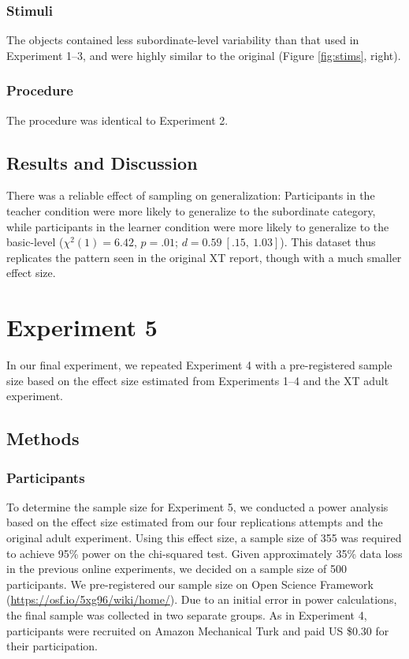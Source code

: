 \documentclass[man]{apa2}
\begin{document}
\subsubsection{Stimuli}

The objects contained less subordinate-level variability than that used in Experiment 1--3, and were highly similar to the original (Figure \ref{fig:stims}, right).

\subsubsection{Procedure}

The procedure was identical to Experiment 2.

\subsection{Results and Discussion}


There was a reliable effect of sampling on generalization: Participants in the teacher condition were more likely to generalize to the subordinate category, while participants in the learner condition were more likely to generalize to the basic-level ($\chi^2(1) = 6.42$, $p = .01$; $d = 0.59\ [.15,\ 1.03]$). This dataset thus replicates the pattern seen in the original XT report, though with a much smaller effect size.

\section{Experiment 5}

In our final experiment, we repeated Experiment 4 with a pre-registered sample size based on the effect size estimated from Experiments 1--4 and the XT adult experiment. 

\subsection{Methods}

\subsubsection{Participants}  

To determine the sample size for Experiment 5, we conducted a power analysis based on the effect size estimated from our four replications attempts and the original adult experiment. Using this  effect size, a sample size of 355 was required to  achieve 95\% power on the chi-squared test. Given approximately 35\% data loss in the previous online experiments, we decided on a sample size of 500 participants. We pre-registered our sample size on Open Science Framework (\url{https://osf.io/5xg96/wiki/home/}). Due to an initial error in power calculations, the final sample was collected in two separate groups. As in Experiment 4, participants were recruited on Amazon Mechanical Turk and  paid US \$0.30 for their participation. 
\end{document}
